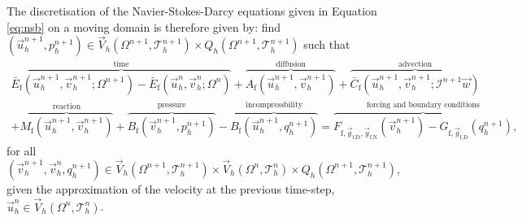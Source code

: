             The discretisation of the Navier-Stokes-Darcy equations given in Equation \eqref{eq:nsb} on a moving domain is therefore given by: find $(\vec{u}^{n+1}_h, p^{n+1}_h) \in \vec{V}_h(\Omega^{n+1}, \mathcal{T}^{n+1}_h) \times Q_h(\Omega^{n+1}, \mathcal{T}^{n+1}_h)$ such that
            \begin{multline}
                \overbrace{\bar{E}_\text{f}(\vec{u}^{n+1}_h, \vec{v}^{n+1}_h; \Omega^{n+1}) - \bar{E}_\text{f}(\vec{u}^n_h, \vec{v}^n_h; \Omega^n)}^{\text{time}} + \overbrace{A_\text{f}(\vec{u}^{n+1}_h, \vec{v}^{n+1}_h)}^{\text{diffusion}} + \overbrace{\bar{C}_\text{f}(\vec{u}^{n+1}_h, \vec{v}^{n+1}_h; \mathcal{I}^{n+1}\vec{w})}^{\text{advection}} \\ + \overbrace{M_\text{f}(\vec{u}^{n+1}_h, \vec{v}^{n+1}_h)}^{\text{reaction}} + \overbrace{B_\text{f}(\vec{v}^{n+1}_h, p^{n+1}_h)}^{\text{pressure}} - \overbrace{B_\text{f}(\vec{u}^{n+1}_h, q^{n+1}_h)}^{\text{incompressbility}} = \overbrace{F_{\text{f},\vec{g}_\text{f,D},\vec{g}_\text{f,N}}(\vec{v}^{n+1}_h) - G_{\text{f},\vec{g}_\text{f,D}}(q^{n+1}_h)}^{\text{forcing and boundary conditions}},
                \label{eq:nsb-mm-discretisation-time}
            \end{multline}
            for all $(\vec{v}^{n+1}_h, \vec{v}^n_h, q^{n+1}_h) \in \vec{V}_h(\Omega^{n+1}, \mathcal{T}_h^{n+1}) \times \vec{V}_h(\Omega^n, \mathcal{T}_h^n) \times Q_h(\Omega^{n+1}, \mathcal{T}_h^{n+1})$, given the approximation of the velocity at the previous time-step, $\vec{u}^n_h \in \vec{V}_h(\Omega^n, \mathcal{T}_h^n)$.

